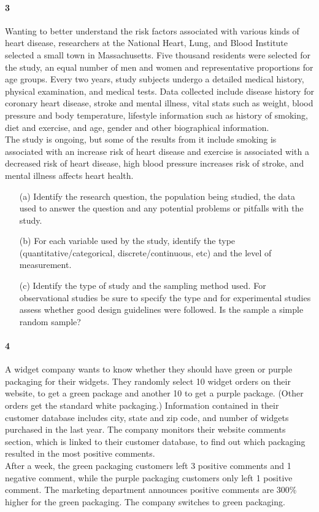 \documentclass{article}
\begin{document}
\begin{flushleft}
\paragraph{3} Wanting to better understand the risk factors associated with various kinds of heart disease, researchers at the National Heart, Lung, and Blood Institute selected a small town in Massachusetts. Five thousand residents were selected for the study, an equal number of men and women and representative proportions for age groups. Every two years, study subjects undergo a detailed medical history, physical examination, and medical tests. Data collected include disease history for coronary heart disease, stroke and mental illness, vital stats such as weight, blood pressure and body temperature, lifestyle information such as history of smoking, diet and exercise, and age, gender and other biographical information.\\
\medskip
The study is ongoing, but some of the results from it include smoking is associated with an increase risk of heart disease and exercise is associated with a decreased risk of heart disease, high blood pressure increases risk of stroke, and mental illness affects heart health.

\begin{itemize}
\item [(a)] Identify the research question, the population being studied, the data used to answer the question and any potential problems or pitfalls with the study.
\vspace{1.5in}
\item[(b)] For each variable used by the study, identify the type (quantitative/categorical, discrete/continuous, etc) and the level of measurement.
\vspace{1.5in}
\item[(c)] Identify the type of study and the sampling method used. For observational studies be sure to specify the type and for experimental studies assess whether good design guidelines were followed. Is the sample a simple random sample?
\end{itemize}

\newpage
\paragraph{4} A widget company wants to know whether they should have green or purple packaging for their widgets. They randomly select 10 widget orders on their website, to get a green package and another 10 to get a purple package. (Other orders get the standard white packaging.) Information contained in their customer database includes city, state and zip code, and number of widgets purchased in the last year. The company monitors their website comments section, which is linked to their customer database, to find out which packaging resulted in the most positive comments.\\
\medskip
After a week, the green packaging customers left 3 positive comments and 1 negative comment, while the purple packaging customers only left 1 positive comment. The marketing department announces positive comments are 300\% higher for the green packaging. The company switches to green packaging.


\end{flushleft}
\end{document}
